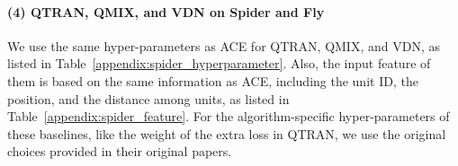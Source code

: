 \documentclass[letterpaper]{article} \usepackage{aaai23}  \usepackage{times}  \usepackage{helvet}  \usepackage{courier}  \usepackage[hyphens]{url}  \usepackage{graphicx} \urlstyle{rm} \def\UrlFont{\rm}  \usepackage{natbib}  \usepackage{caption} \frenchspacing  \setlength{\pdfpagewidth}{8.5in} \setlength{\pdfpageheight}{11in} \usepackage{algorithm}
\begin{document}
\paragraph{(4) QTRAN, QMIX, and VDN on Spider and Fly~\citeyear{cds}}
We use the same hyper-parameters as ACE for QTRAN, QMIX, and VDN, as listed in Table~\ref{appendix:spider_hyperparameter}. Also, the input feature of them is based on the same information as ACE, including the unit ID, the position, and the distance among units, as listed in Table~\ref{appendix:spider_feature}. For the algorithm-specific hyper-parameters of these baselines, like the weight of the extra loss in QTRAN, we use the original choices provided in their original papers.
\begin{table}[h]
\centering
{}
\end{table}
\end{document}
